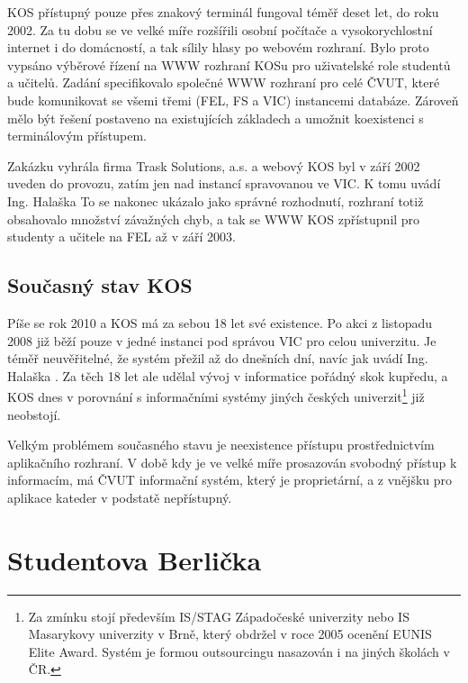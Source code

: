 \documentclass[11pt,twoside,a4paper]{book}
\begin{document}
KOS přístupný pouze přes znakový terminál fungoval téměř deset let, do roku 2002. Za tu dobu se ve velké míře rozšířili osobní počítače a vysokorychlostní internet i do domácností, a tak sílily hlasy po webovém rozhraní. Bylo proto vypsáno výběrové řízení na WWW rozhraní KOSu pro uživatelské role studentů a učitelů. Zadání specifikovalo společné WWW rozhraní pro celé ČVUT, které bude komunikovat se všemi třemi (FEL, FS a VIC) instancemi  databáze. Zároveň mělo být řešení postaveno na existujících základech a umožnit koexistenci s terminálovým přístupem. 

Zakázku vyhrála firma Trask Solutions, a.s. a webový KOS byl v září 2002 uveden do provozu, zatím jen nad instancí spravovanou ve VIC. K tomu uvádí Ing. Halaška\cite{student:komentar-ke-kos} \textit{} To se nakonec ukázalo jako správné rozhodnutí, rozhraní totiž obsahovalo množství závažných chyb, a tak se WWW KOS zpřístupnil pro studenty a učitele na FEL až v září 2003\cite{student:kos-na-web}.

\subsection{Současný stav KOS}
Píše se rok 2010 a KOS má za sebou 18 let své existence. Po akci  z listopadu 2008\cite{sik} již běží pouze v jedné instanci pod správou VIC pro celou univerzitu. Je téměř neuvěřitelné, že systém přežil až do dnešních dní, navíc jak uvádí Ing. Halaška\cite{student:komentar-ke-kos} \textit{}. Za těch 18 let ale udělal vývoj v informatice pořádný skok kupředu, a KOS dnes v porovnání s informačními systémy jiných českých univerzit\footnote{Za zmínku stojí především IS/STAG Západočeské univerzity nebo IS Masarykovy univerzity v Brně, který obdržel v roce 2005 ocenění EUNIS Elite Award. Systém je formou outsourcingu nasazován i na jiných školách v ČR. } již neobstojí.

Velkým problémem současného stavu je neexistence přístupu prostřednictvím aplikačního rozhraní. V době kdy je ve velké míře prosazován svobodný přístup k informacím, má ČVUT informační systém, který je proprietární, a z vnějšku pro aplikace kateder v podstatě nepřístupný.


\section{Studentova Berlička}
\end{document}
